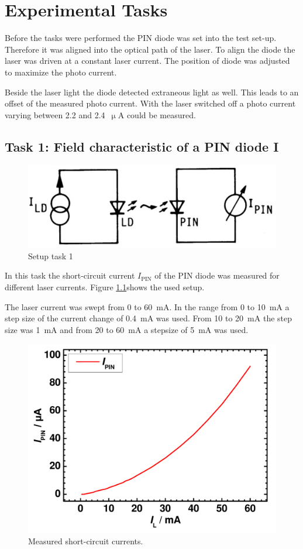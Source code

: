 \chapter{Experimental Tasks}

Before the tasks were performed the PIN diode was set into the test set-up. Therefore it was aligned into the optical path of the laser. To align the diode the laser was driven at a constant laser current. The position of diode was adjusted to maximize the photo current. 


Beside the laser light the diode detected extraneous light as well. This leads to an offset of the measured photo current. With the laser switched off a photo current varying between 2.2 and 2.4~$\upmu$A could be measured.

\section{Task 1: Field characteristic of a PIN diode I}
\label{T1}
\begin{figure}%
\centering
\includegraphics[width=.5\columnwidth]{Grafiken/T1_setup.jpg}%
\caption{Setup task 1}%
\label{fig:T1_setup}%
\end{figure}
In this task the short-circuit current $I_{\mathrm{PIN}}$ of the PIN diode was measured for different laser currents. Figure \ref{fig:T1_setup}\footnotemark[1] shows the used setup. 

The laser current was swept from 0 to 60~mA. In the range from 0 to 10~mA a step size of the current change of 0.4~mA was used. From 10 to 20~mA the step size was 1~mA and from 20 to 60~mA a stepsize of 5~mA was used.

\begin{figure}%
\centering
\includegraphics[width=.5\columnwidth]{Grafiken/T1_laser.pdf}%
\caption{Measured short-circuit currents.}%
\label{fig:T1_laser}%
\end{figure}

